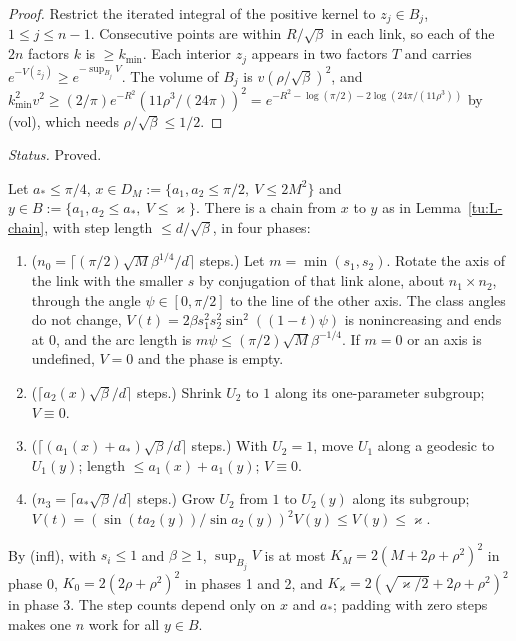 \begin{proof}
Restrict the iterated integral of the positive kernel to $z_j\in B_j$, $1\le j\le n-1$. Consecutive points are within
$R/\sqrt\beta$ in each link, so each of the $2n$ factors $k$ is $\ge k_{\min}$. Each interior $z_j$ appears in two
factors $T$ and carries $e^{-V(z_j)}\ge e^{-\sup_{B_j}V}$. The volume of $B_j$ is $v(\rho/\sqrt\beta)^2$, and
$k_{\min}^2v^2\ge(2/\pi)e^{-R^2}(11\rho^3/(24\pi))^2=e^{-R^2-\log(\pi/2)-2\log(24\pi/(11\rho^3))}$ by (vol), which needs
$\rho/\sqrt\beta\le1/2$.
\end{proof}

\noindent\emph{Status.} Proved.

\begin{lemma}\label{tu:L-geom}
Let $a_*\le\pi/4$, $x\in D_M:=\{a_1,a_2\le\pi/2,\ V\le2M^2\}$ and $y\in B:=\{a_1,a_2\le a_*,\ V\le\varkappa\}$. There is a
chain from $x$ to $y$ as in Lemma~\ref{tu:L-chain}, with step length $\le d/\sqrt\beta$, in four phases:
\begin{enumerate}
\item[0.] ($n_0=\lceil(\pi/2)\sqrt M\beta^{1/4}/d\rceil$ steps.) Let $m=\min(s_1,s_2)$. Rotate the axis of the link with the smaller
$s$ by conjugation of that link alone, about $n_1\times n_2$, through the angle $\psi\in[0,\pi/2]$ to the line of the other axis.
The class angles do not change, $V(t)=2\beta s_1^2s_2^2\sin^2((1-t)\psi)$ is nonincreasing and ends at $0$, and the arc length is
$m\psi\le(\pi/2)\sqrt M\beta^{-1/4}$. If $m=0$ or an axis is undefined, $V=0$ and the phase is empty.
\item[1.] ($\lceil a_2(x)\sqrt\beta/d\rceil$ steps.) Shrink $U_2$ to $1$ along its one-parameter subgroup; $V\equiv0$.
\item[2.] ($\lceil(a_1(x)+a_*)\sqrt\beta/d\rceil$ steps.) With $U_2=1$, move $U_1$ along a geodesic to $U_1(y)$; length
$\le a_1(x)+a_1(y)$; $V\equiv0$.
\item[3.] ($n_3=\lceil a_*\sqrt\beta/d\rceil$ steps.) Grow $U_2$ from $1$ to $U_2(y)$ along its subgroup;
$V(t)=(\sin(ta_2(y))/\sin a_2(y))^2V(y)\le V(y)\le\varkappa$.
\end{enumerate}
By (infl), with $s_i\le1$ and $\beta\ge1$, $\sup_{B_j}V$ is at most $K_M=2(M+2\rho+\rho^2)^2$ in phase 0,
$K_0=2(2\rho+\rho^2)^2$ in phases 1 and 2, and $K_\varkappa=2(\sqrt{\varkappa/2}+2\rho+\rho^2)^2$ in phase 3. The step counts
depend only on $x$ and $a_*$; padding with zero steps makes one $n$ work for all $y\in B$.
\end{lemma}

